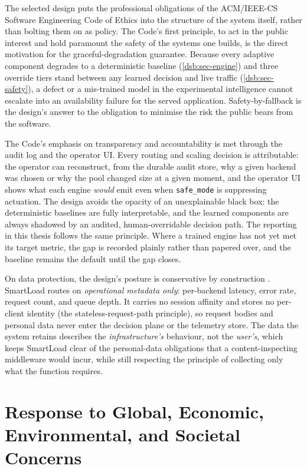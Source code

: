 The selected design puts the professional obligations of the ACM/IEEE-CS
Software Engineering Code of Ethics \cite{gotterbarn1999ethics,acm2018ethics}
into the structure of the system itself, rather than bolting them on as policy.
The Code's first principle, to act in the public interest and hold paramount the
safety of the systems one builds, is the direct motivation for the
graceful-degradation guarantee. Because every adaptive component degrades to a
deterministic baseline (\cref{dsb:sec-engine}) and three override tiers stand
between any learned decision and live traffic (\cref{dsb:sec-safety}), a defect
or a mis-trained model in the experimental intelligence cannot escalate into an
availability failure for the served application. Safety-by-fallback is the
design's answer to the obligation to minimise the risk the public bears from the
software.

The Code's emphasis on transparency and accountability is met through the audit
log and the operator UI. Every routing and scaling decision is attributable: the
operator can reconstruct, from the durable audit store, why a given backend was
chosen or why the pool changed size at a given moment, and the operator UI shows
what each engine \emph{would} emit even when \texttt{safe\_mode} is suppressing
actuation. The design avoids the opacity of an unexplainable black box: the
deterministic baselines are fully interpretable, and the learned components are
always shadowed by an audited, human-overridable decision path. The reporting in
this thesis follows the same principle. Where a trained engine has not yet met
its target metric, the gap is recorded plainly rather than papered over, and the
baseline remains the default until the gap closes.

On data protection, the design's posture is conservative by construction
\cite{gdpr2016}. SmartLoad routes on \emph{operational metadata only}: per-backend
latency, error rate, request count, and queue depth. It carries no session
affinity and stores no per-client identity (the stateless-request-path
principle), so request bodies and personal data never enter the decision plane or
the telemetry store. The data the system retains describes the
\emph{infrastructure's} behaviour, not the \emph{user's}, which keeps SmartLoad
clear of the personal-data obligations that a content-inspecting middleware would
incur, while still respecting the principle of collecting only what the function
requires.

\section{Response to Global, Economic, Environmental, and Societal Concerns}
\label{dsb:sec-impact}

